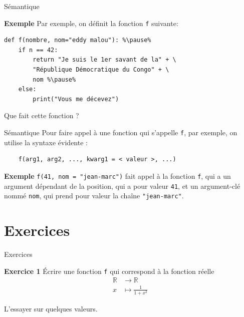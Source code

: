 \documentclass[10pt,xcolor={dvipsnames}]{beamer}
\newcommand{\R}{\mathbb R}
\newcounter{Exercice}
\newcounter{Exemple}
\begin{document}
\begin{frame}[fragile]{Sémantique}
\begin{block}{\textbf{Exemple}}
Par exemple, on définit la fonction \lstinline|f| suivante:\pause
\begin{lstlisting}[escapechar=\%]
def f(nombre, nom="eddy malou"): %\pause%
    if n == 42:
        return "Je suis le 1er savant de la" + \
		"République Démocratique du Congo" + \
		nom %\pause%
    else:
        print("Vous me décevez")
\end{lstlisting}
\end{block}
\pause

Que fait cette fonction ?

\end{frame}

\begin{frame}[fragile]{Sémantique}
	Pour faire appel à une fonction qui s'appelle \lstinline|f|, par exemple, on utilise la syntaxe évidente :
	\begin{lstlisting}
	f(arg1, arg2, ..., kwarg1 = < valeur >, ...)
	\end{lstlisting}
	\pause
	
	\begin{block}{\textbf{Exemple}}
	\lstinline|f(41, nom = "jean-marc")| fait appel à la fonction \lstinline|f|, qui a un argument dépendant de la position, qui a pour valeur \lstinline|41|, et un argument-clé nommé \lstinline|nom|, qui prend pour valeur la chaîne \lstinline|"jean-marc"|.
	\end{block}
\end{frame}

\section{Exercices}

\begin{frame}[fragile]{Exercices}
\begin{block}{\textbf{Exercice 1}}
	Écrire une fonction \lstinline|f| qui correspond à la fonction réelle
    \[
    \begin{array}{rl}
    \R &\longrightarrow \R \\
    x &\longmapsto \frac{1}{1+x^2}
    \end{array}
    \]
    
    L'essayer sur quelques valeurs.
\end{block}
\end{frame}
\end{document}
